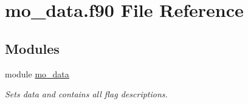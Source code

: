 \hypertarget{mo__data_8f90}{
\section{mo\_\-data.f90 File Reference}
\label{mo__data_8f90}
}
\subsection*{Modules}
\begin{DoxyCompactItemize}
\item 
module \hyperlink{namespacemo__data}{mo\_\-data}


\begin{DoxyCompactList}\small\item\em Sets data and contains all flag descriptions. \item\end{DoxyCompactList}

\end{DoxyCompactItemize}
